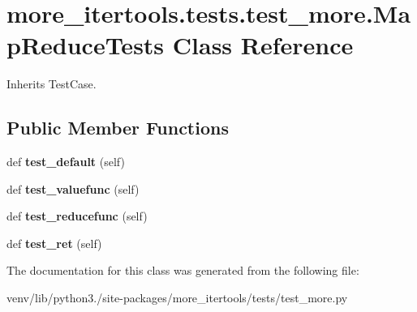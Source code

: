 \hypertarget{classmore__itertools_1_1tests_1_1test__more_1_1_map_reduce_tests}{}\section{more\+\_\+itertools.\+tests.\+test\+\_\+more.\+Map\+Reduce\+Tests Class Reference}
\label{classmore__itertools_1_1tests_1_1test__more_1_1_map_reduce_tests}


Inherits Test\+Case.

\subsection*{Public Member Functions}
\begin{DoxyCompactItemize}
\item 
\mbox{\label{classmore__itertools_1_1tests_1_1test__more_1_1_map_reduce_tests_a4b45f88d8c4cc02546622eb926cc4a6d}} 
def {\bfseries test\+\_\+default} (self)
\item 
\mbox{\label{classmore__itertools_1_1tests_1_1test__more_1_1_map_reduce_tests_a8fd1fd3ec001aafe4b10a8a5e2b89f17}} 
def {\bfseries test\+\_\+valuefunc} (self)
\item 
\mbox{\label{classmore__itertools_1_1tests_1_1test__more_1_1_map_reduce_tests_ac43ad5d42425cfb40a877a4a0fdec574}} 
def {\bfseries test\+\_\+reducefunc} (self)
\item 
\mbox{\label{classmore__itertools_1_1tests_1_1test__more_1_1_map_reduce_tests_aa1bba083b7494b9e99e372507365374b}} 
def {\bfseries test\+\_\+ret} (self)
\end{DoxyCompactItemize}


The documentation for this class was generated from the following file\+:\begin{DoxyCompactItemize}
\item 
venv/lib/python3./site-\/packages/more\+\_\+itertools/tests/test\+\_\+more.\+py\end{DoxyCompactItemize}
